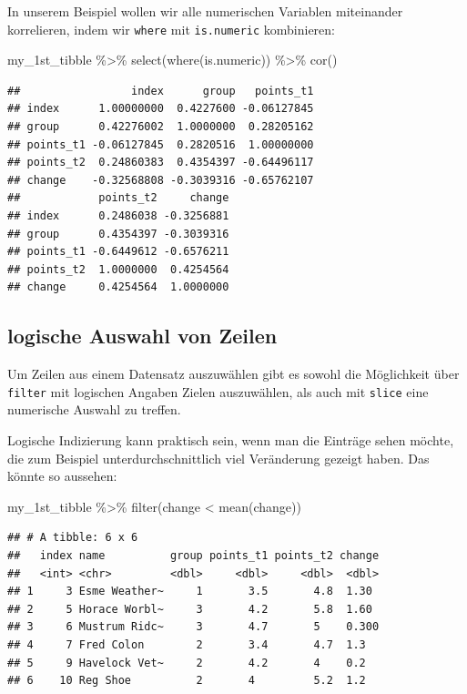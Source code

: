 \documentclass[
]{book}
\newenvironment{Shaded}{\begin{snugshade}}{\end{snugshade}}
\newcommand{\FunctionTok}[1]{\textcolor[rgb]{0.00,0.00,0.00}{#1}}
\newcommand{\NormalTok}[1]{#1}
\newcommand{\SpecialCharTok}[1]{\textcolor[rgb]{0.00,0.00,0.00}{#1}}
\begin{document}
In unserem Beispiel wollen wir alle numerischen Variablen miteinander korrelieren, indem wir \texttt{where} mit \texttt{is.numeric} kombinieren:

\begin{Shaded}
\begin{Highlighting}[]
\NormalTok{my\_1st\_tibble }\SpecialCharTok{\%\textgreater{}\%} 
  \FunctionTok{select}\NormalTok{(}\FunctionTok{where}\NormalTok{(is.numeric)) }\SpecialCharTok{\%\textgreater{}\%} 
  \FunctionTok{cor}\NormalTok{()}
\end{Highlighting}
\end{Shaded}

\begin{verbatim}
##                 index      group   points_t1
## index      1.00000000  0.4227600 -0.06127845
## group      0.42276002  1.0000000  0.28205162
## points_t1 -0.06127845  0.2820516  1.00000000
## points_t2  0.24860383  0.4354397 -0.64496117
## change    -0.32568808 -0.3039316 -0.65762107
##            points_t2     change
## index      0.2486038 -0.3256881
## group      0.4354397 -0.3039316
## points_t1 -0.6449612 -0.6576211
## points_t2  1.0000000  0.4254564
## change     0.4254564  1.0000000
\end{verbatim}

\hypertarget{logische-auswahl-von-zeilen}{%
\subsection{logische Auswahl von Zeilen}\label{logische-auswahl-von-zeilen}}

Um Zeilen aus einem Datensatz auszuwählen gibt es sowohl die Möglichkeit über \texttt{filter} mit logischen Angaben Zielen auszuwählen, als auch mit \texttt{slice} eine numerische Auswahl zu treffen.

Logische Indizierung kann praktisch sein, wenn man die Einträge sehen möchte, die zum Beispiel unterdurchschnittlich viel Veränderung gezeigt haben. Das könnte so aussehen:

\begin{Shaded}
\begin{Highlighting}[]
\NormalTok{my\_1st\_tibble }\SpecialCharTok{\%\textgreater{}\%} 
  \FunctionTok{filter}\NormalTok{(change }\SpecialCharTok{\textless{}} \FunctionTok{mean}\NormalTok{(change))}
\end{Highlighting}
\end{Shaded}

\begin{verbatim}
## # A tibble: 6 x 6
##   index name          group points_t1 points_t2 change
##   <int> <chr>         <dbl>     <dbl>     <dbl>  <dbl>
## 1     3 Esme Weather~     1       3.5       4.8  1.30 
## 2     5 Horace Worbl~     3       4.2       5.8  1.60 
## 3     6 Mustrum Ridc~     3       4.7       5    0.300
## 4     7 Fred Colon        2       3.4       4.7  1.3  
## 5     9 Havelock Vet~     2       4.2       4    0.2  
## 6    10 Reg Shoe          2       4         5.2  1.2
\end{verbatim}
\end{document}
